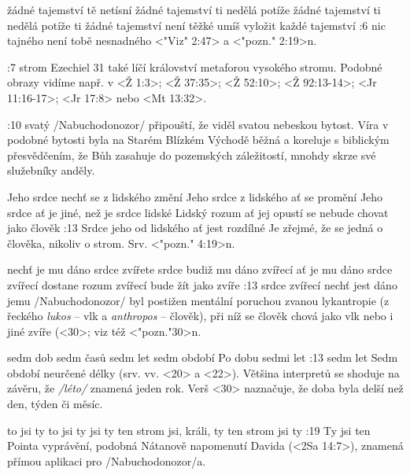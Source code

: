    {žádné tajemství tě netísní}   %
    {žádné tajemství ti nedělá potíže}   %
    {žádné tajemství ti nedělá potíže}   %
    {ti žádné tajemství není těžké}   %
    {umíš vyložit každé tajemství}   %
:6 {nic tajného není tobě nesnadného}  <"Viz" 2:47> a <"pozn." 2:19>n.

:7 {strom} Ezechiel 31 také líčí království metaforou vysokého stromu. Podobné obrazy vidíme např. v <Ž 1:3>; <Ž 37:35>; <Ž 52:10>; <Ž 92:13-14>; <Jr 11:16-17>; <Jr 17:8> nebo <Mt 13:32>. 

:10 {svatý}  \x/Nabuchodonozor/ připouští, že viděl svatou nebeskou bytost. Víra v podobné bytosti byla na Starém Blízkém Východě běžná a koreluje s biblickým přesvědčením, že Bůh zasahuje do pozemských záležitostí, mnohdy skrze své služebníky anděly.

    {Jeho srdce nechť se z lidského změní}   %
    {Jeho srdce z lidského ať se promění}   %
    {Jeho srdce ať je jiné, než je srdce lidské}   %
    {Lidský rozum ať jej opustí}   %
    {se nebude chovat jako člověk}   %
:13 {Srdce jeho od lidského ať jest rozdílné}
    Je zřejmé, že se jedná o člověka, nikoliv o strom. Srv. <"pozn." 4:19>n.

    {nechť je mu dáno srdce zvířete}   %
    {srdce budiž mu dáno zvířecí}   %
    {ať je mu dáno srdce zvířecí}   %
    {dostane rozum zvířecí}   %
    {bude žít jako zvíře}   %
:13 {srdce zvířecí nechť jest dáno jemu} 
     \x/Nabuchodonozor/  byl postižen mentální poruchou zvanou lykantropie 
     (z řeckého {\em lukos} -- vlk a {\em anthropos} -- člověk), 
     při níž  se člověk chová jako vlk nebo i jiné zvíře (<30>; viz též <"pozn."30>n. 

    {sedm dob}   %
    {sedm časů}   %
    {sedm let}   %
    {sedm období}   %
    {Po dobu sedmi let}   %
:13 {sedm let} 
     Sedm období neurčené délky (srv. vv. <20> a <22>). Většina interpretů se shoduje na závěru, že {\em \x/léto/} znamená jeden rok. Verš <30> naznačuje, že doba byla delší než den, týden či měsíc.

    {to jsi ty}   %
    {to jsi ty}   %
    {jsi ty}   %
    {ten strom jsi, králi, ty}   %
    {ten strom jsi ty}   %
:19 {Ty jsi ten} Pointa vyprávění, podobná Nátanově napomenutí Davida (<2Sa 14:7>), znamená přímou aplikaci pro \x/Nabuchodonozor/a.

